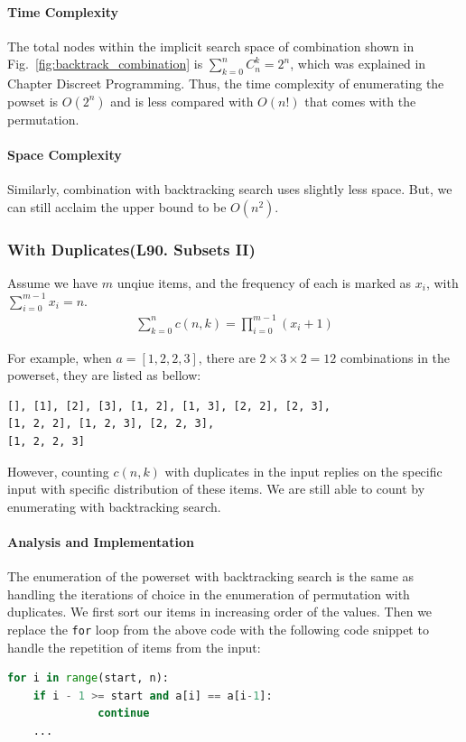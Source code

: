 \documentclass[../main.tex]{subfiles}
\begin{document}
\paragraph{Time Complexity} The total nodes within the implicit search space of combination shown in Fig.~\ref{fig:backtrack_combination} is $\sum_{k=0}^{n}C_{n}^{k} =2^n$, which was explained in Chapter Discreet Programming. Thus, the time complexity of enumerating the powset is $O(2^n)$ and is less compared with $O(n!)$ that comes with the permutation.

\paragraph{Space Complexity} Similarly, combination with backtracking search uses slightly less space. But, we can still acclaim the upper bound to be $O(n^2)$. 

\subsubsection{With Duplicates(L90. Subsets II)}
 Assume we have $m$ unqiue items, and the frequency of each is marked as $x_i$, with $\sum_{i=0}^{m-1}x_i = n$. 
\begin{align}
\sum_{k=0}^{n} c(n, k) = \prod_{i=0}^{m-1}(x_i + 1)
\end{align}

For example, when $a=[1, 2, 2, 3]$, there are $2\times 3 \times 2 = 12$ combinations in the powerset, they are listed as bellow:
\begin{lstlisting}[numbers=none]
[], [1], [2], [3], [1, 2], [1, 3], [2, 2], [2, 3],
[1, 2, 2], [1, 2, 3], [2, 2, 3],
[1, 2, 2, 3]
\end{lstlisting}
However, counting $c(n, k)$ with duplicates in the input replies on the specific input with specific distribution of these items. We are still able to count by enumerating with backtracking search. 
\paragraph{Analysis and Implementation} The enumeration of the powerset with backtracking search is the same as handling the iterations of choice in the enumeration of permutation with duplicates. We first sort our items in increasing order of the values. Then we replace the \texttt{for} loop from the above code with the following code snippet to handle the repetition of items from the input:
\begin{lstlisting}[language=Python]
  for i in range(start, n): 
    if i - 1 >= start and a[i] == a[i-1]:
              continue   
    ...
\end{lstlisting}
\end{document}

